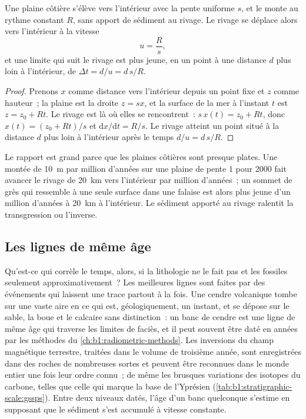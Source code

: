 \begin{proposition}\label{prop:b1:stratigraphic-scale:transgression}
Une plaine côtière s'élève vers l'intérieur avec la pente uniforme $s$, et le  monte au rythme constant $R$, sans apport de sédiment au rivage. Le
rivage se déplace alors vers l'intérieur à la vitesse
\[
  u = \frac{R}{s},
\]
et une limite qui suit le rivage est plus jeune, en un point à une distance $d$
plus loin à l'intérieur, de $\Delta t = d/u = d\,s/R$.
\end{proposition}

\begin{proof}
Prenons $x$ comme distance vers l'intérieur depuis un point fixe et $z$ comme hauteur~; la
plaine est la droite $z = s x$, et la surface de la mer à l'instant $t$ est
$z = z_0 + R t$. Le rivage est là où elles se rencontrent~: $s\,x(t) = z_0 + R t$, donc
$x(t) = (z_0 + R t)/s$ et $\mathrm dx/\mathrm dt = R/s$. Le rivage atteint
un point situé à la distance $d$ plus loin à l'intérieur après le temps $d/u = d\,s/R$.
\end{proof}

Le rapport est grand parce que les plaines côtières sont presque plates. Une montée de
\qty{10}{m} par million d'années sur une plaine de pente $1$ pour $2000$ fait avancer le rivage
de \qty{20}{km} vers l'intérieur par million d'années~; un sommet de grès qui ressemble à une seule
surface dans une falaise est alors plus jeune d'un million d'années à \qty{20}{km} à l'intérieur. Le sédiment
apporté au rivage ralentit la transgression ou l'inverse.

\subsection*{Les lignes de même âge}

Qu'est-ce qui corrèle le temps, alors, si la lithologie ne le fait pas et les fossiles seulement
approximativement~? Les meilleures lignes sont faites par des événements qui laissent une trace partout
à la fois. Une cendre volcanique tombe sur une vaste aire en ce qui est, géologiquement, un
instant, et se dépose sur le sable, la boue et le calcaire sans distinction~: un banc de cendre est une ligne de même
âge qui traverse les limites de faciès, et il peut souvent être daté en années par les
méthodes du \cref{ch:b1:radiometric-methods}. Les inversions du champ magnétique
terrestre, traitées dans le volume de troisième année, sont enregistrées dans des roches de nombreuses sortes et peuvent
être reconnues dans le monde entier une fois leur ordre connu~; de même les brusques variations des
isotopes du carbone, telles que celle qui marque la base de l'Yprésien
(\cref{tab:b1:stratigraphic-scale:gssps}). Entre deux
niveaux datés, l'âge d'un banc quelconque s'estime en supposant que le sédiment
s'est accumulé à vitesse constante.

